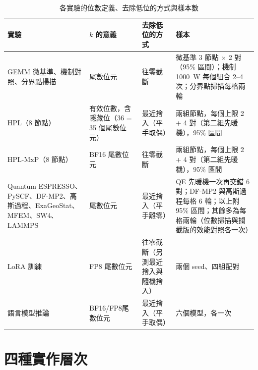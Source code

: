 \begin{table}[htbp]
\centering
\caption{各實驗的位數定義、去除低位的方式與樣本數}\label{tab:settings}
\small\renewcommand{\arraystretch}{1.3}
\begin{tabularx}{\textwidth}{@{}>{\raggedright\arraybackslash}p{3.6cm}>{\raggedright\arraybackslash}p{2.9cm}>{\raggedright\arraybackslash}p{3.1cm}L@{}}
\toprule
實驗 & $k$ 的意義 & 去除低位的方式 & 樣本 \\
\midrule
GEMM 微基準、機制對照、分界點掃描 & 尾數位元 & 往零截斷 & 微基準 3 節點 $\times$ 2 對（95\% 區間）；機制 1000~W 每個組合 2–4 次；分界點掃描每格兩輪 \\ \addlinespace[2pt]
HPL（8 節點） & 有效位數，\newline 含隱藏位\newline（36 = 35 個\newline 尾數位元） & 最近捨入\newline（平手取偶） & 兩組節點，每個上限 2 + 4 對（第二組先暖機），95\% 區間 \\ \addlinespace[2pt]
HPL-MxP（8 節點） & BF16 尾數位元 & 往零截斷 & 兩組節點，每個上限 2 + 4 對（第二組先暖機），95\% 區間 \\ \addlinespace[2pt]
Quantum ESPRESSO、PySCF、\newline DF-MP2、高斯過程、\newline ExaGeoStat、MFEM、\newline SW4、LAMMPS & 尾數位元 & 最近捨入\newline（平手離零） & QE 先暖機一次再交錯 6 對；DF-MP2 與高斯過程每格 6 輪；以上附 95\% 區間；其餘多為每格兩輪（位數掃描與攔截版的效能對照各一次） \\ \addlinespace[2pt]
LoRA 訓練 & FP8 尾數位元 & 往零截斷\newline（另測最近捨入與隨機捨入） & 兩個 seed、四組配對 \\ \addlinespace[2pt]
語言模型推論 & BF16/FP8\newline 尾數位元 & 最近捨入\newline（平手取偶） & 六個模型，各一次 \\
\bottomrule
\end{tabularx}
\end{table}

\section{四種實作層次}\label{sec:impl}

